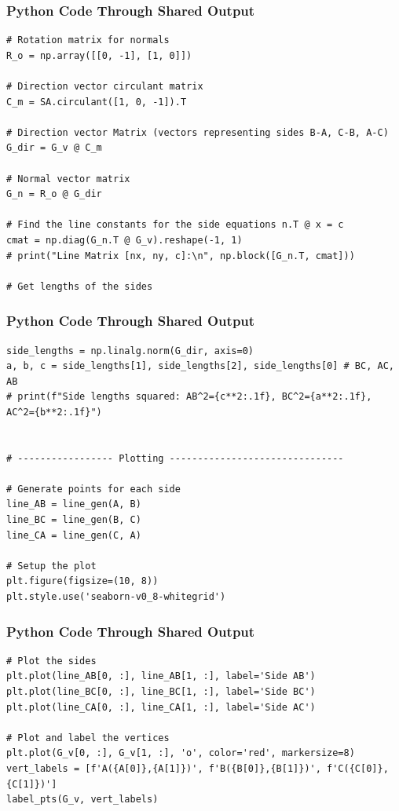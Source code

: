 \documentclass{beamer}
\begin{document}
\begin{frame}[fragile]
\frametitle{Python Code Through Shared Output}
\begin{lstlisting}
# Rotation matrix for normals
R_o = np.array([[0, -1], [1, 0]])

# Direction vector circulant matrix
C_m = SA.circulant([1, 0, -1]).T

# Direction vector Matrix (vectors representing sides B-A, C-B, A-C)
G_dir = G_v @ C_m

# Normal vector matrix
G_n = R_o @ G_dir

# Find the line constants for the side equations n.T @ x = c
cmat = np.diag(G_n.T @ G_v).reshape(-1, 1)
# print("Line Matrix [nx, ny, c]:\n", np.block([G_n.T, cmat]))

# Get lengths of the sides
\end{lstlisting}
\end{frame}  

\begin{frame}[fragile]
\frametitle{Python Code Through Shared Output}
\begin{lstlisting}
side_lengths = np.linalg.norm(G_dir, axis=0)
a, b, c = side_lengths[1], side_lengths[2], side_lengths[0] # BC, AC, AB
# print(f"Side lengths squared: AB^2={c**2:.1f}, BC^2={a**2:.1f}, AC^2={b**2:.1f}")


# ----------------- Plotting -------------------------------

# Generate points for each side
line_AB = line_gen(A, B)
line_BC = line_gen(B, C)
line_CA = line_gen(C, A)

# Setup the plot
plt.figure(figsize=(10, 8))
plt.style.use('seaborn-v0_8-whitegrid')
\end{lstlisting}
\end{frame}  

\begin{frame}[fragile]
\frametitle{Python Code Through Shared Output}
\begin{lstlisting}
# Plot the sides
plt.plot(line_AB[0, :], line_AB[1, :], label='Side AB')
plt.plot(line_BC[0, :], line_BC[1, :], label='Side BC')
plt.plot(line_CA[0, :], line_CA[1, :], label='Side AC')

# Plot and label the vertices
plt.plot(G_v[0, :], G_v[1, :], 'o', color='red', markersize=8)
vert_labels = [f'A({A[0]},{A[1]})', f'B({B[0]},{B[1]})', f'C({C[0]},{C[1]})']
label_pts(G_v, vert_labels)
\end{lstlisting}
\end{frame}  
\end{document}
